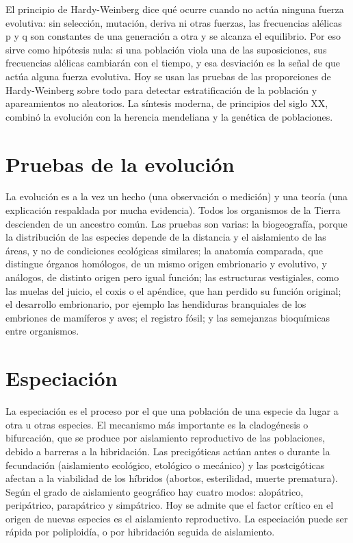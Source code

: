 \documentclass{book}
\begin{document}
El principio de Hardy-Weinberg dice qué ocurre cuando no actúa ninguna fuerza evolutiva: sin selección, mutación, deriva ni otras fuerzas, las frecuencias alélicas p y q son constantes de una generación a otra y se alcanza el equilibrio. Por eso sirve como hipótesis nula: si una población viola una de las suposiciones, sus frecuencias alélicas cambiarán con el tiempo, y esa desviación es la señal de que actúa alguna fuerza evolutiva. Hoy se usan las pruebas de las proporciones de Hardy-Weinberg sobre todo para detectar estratificación de la población y apareamientos no aleatorios. La síntesis moderna, de principios del siglo XX, combinó la evolución con la herencia mendeliana y la genética de poblaciones.


\section{Pruebas de la evolución}

La evolución es a la vez un hecho (una observación o medición) y una teoría (una explicación respaldada por mucha evidencia). Todos los organismos de la Tierra descienden de un ancestro común. Las pruebas son varias: la biogeografía, porque la distribución de las especies depende de la distancia y el aislamiento de las áreas, y no de condiciones ecológicas similares; la anatomía comparada, que distingue órganos homólogos, de un mismo origen embrionario y evolutivo, y análogos, de distinto origen pero igual función; las estructuras vestigiales, como las muelas del juicio, el coxis o el apéndice, que han perdido su función original; el desarrollo embrionario, por ejemplo las hendiduras branquiales de los embriones de mamíferos y aves; el registro fósil; y las semejanzas bioquímicas entre organismos.


\section{Especiación}

La especiación es el proceso por el que una población de una especie da lugar a otra u otras especies. El mecanismo más importante es la cladogénesis o bifurcación, que se produce por aislamiento reproductivo de las poblaciones, debido a barreras a la hibridación. Las precigóticas actúan antes o durante la fecundación (aislamiento ecológico, etológico o mecánico) y las postcigóticas afectan a la viabilidad de los híbridos (abortos, esterilidad, muerte prematura). Según el grado de aislamiento geográfico hay cuatro modos: alopátrico, peripátrico, parapátrico y simpátrico. Hoy se admite que el factor crítico en el origen de nuevas especies es el aislamiento reproductivo. La especiación puede ser rápida por poliploidía, o por hibridación seguida de aislamiento.
\end{document}
